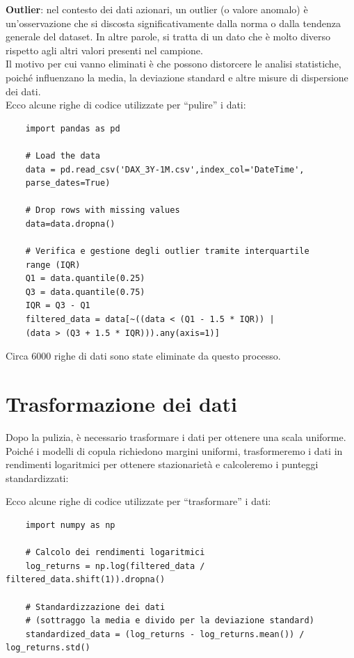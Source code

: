 \documentclass[%
	corpo=11pt,
    twoside,
    stile=classica,
    oldstyle,
    tipotesi=custom,
    greek,
    evenboxes,
]{toptesi}
\begin{document}
\textbf{Outlier}: nel contesto dei dati azionari, un outlier (o valore anomalo) è un’osservazione che si discosta significativamente dalla norma o dalla tendenza generale del dataset. In altre parole, si tratta di un dato che è molto diverso rispetto agli altri valori presenti nel campione.\\

Il motivo per cui vanno eliminati è che possono distorcere le analisi statistiche, poiché influenzano la media, la deviazione standard e altre misure di dispersione dei dati.\\

Ecco alcune righe di codice utilizzate per ``pulire'' i dati:
\begin{verbatim}
	import pandas as pd
	
	# Load the data
	data = pd.read_csv('DAX_3Y-1M.csv',index_col='DateTime',
	parse_dates=True)
	
	# Drop rows with missing values
	data=data.dropna()
	
	# Verifica e gestione degli outlier tramite interquartile
	range (IQR)
	Q1 = data.quantile(0.25)
	Q3 = data.quantile(0.75)
	IQR = Q3 - Q1
	filtered_data = data[~((data < (Q1 - 1.5 * IQR)) | 
	(data > (Q3 + 1.5 * IQR))).any(axis=1)]
\end{verbatim}

Circa 6000 righe di dati sono state eliminate da questo processo.
\newpage
\section{Trasformazione dei dati}

Dopo la pulizia, è necessario trasformare i dati per ottenere una scala uniforme. Poiché i modelli di copula richiedono margini uniformi, trasformeremo i dati in rendimenti logaritmici per ottenere stazionarietà e calcoleremo i punteggi standardizzati:

Ecco alcune righe di codice utilizzate per ``trasformare'' i dati:

\begin{verbatim}
	import numpy as np
	
	# Calcolo dei rendimenti logaritmici
	log_returns = np.log(filtered_data / filtered_data.shift(1)).dropna()
	
	# Standardizzazione dei dati
	# (sottraggo la media e divido per la deviazione standard)
	standardized_data = (log_returns - log_returns.mean()) / log_returns.std()
\end{verbatim}
\end{document}

